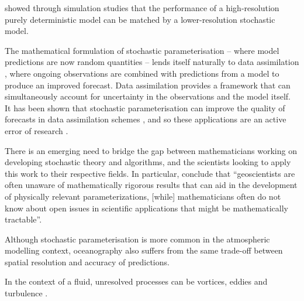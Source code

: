 \citet{DawsonPalmer_2015_SimulatingWeatherRegimes} showed through simulation studies that the performance of a high-resolution purely deterministic model can be matched by a lower-resolution stochastic model.


The mathematical formulation of stochastic parameterisation -- where model predictions are now random quantities -- lends itself naturally to data assimilation \citep{BudhirajaEtAl_2019_AssimilatingDataModels,Jazwinski_2014_StochasticProcessesFiltering,LawEtAl_2015_DataAssimilationMathematical,ReichCotter_2015_ProbabilisticForecastingBayesian}, where ongoing observations are combined with predictions from a model to produce an improved forecast.
Data assimilation provides a framework that can simultaneously account for uncertainty in the observations and the model itself.
It has been shown that stochastic parameterisation can improve the quality of forecasts in data assimilation schemes \citep{MitchellGottwald_2012_DataAssimilationSlow,HaEtAl_2015_ComparisonModelError}, and so these applications are an active error of research \citep[e.g.]{GottwaldHarlim_2013_RoleAdditiveMultiplicative}.

There is an emerging need to bridge the gap between mathematicians working on developing stochastic theory and algorithms, and the scientists looking to apply this work to their respective fields.
In particular, \citet{BernerEtAl_2017_StochasticParameterizationNew} conclude that ``geoscientists are often unaware of mathematically rigorous results that can aid in the development of physically relevant parameterizations, [while] mathematicians often do not know about open issues in scientific applications that might be mathematically tractable''.


Although stochastic parameterisation is more common in the atmospheric modelling context, oceanography also suffers from the same trade-off between spatial resolution and accuracy of predictions.

In the context of a fluid, unresolved processes can be vortices, eddies and turbulence \citep{Griffa_1996_ApplicationsStochasticParticle}.

